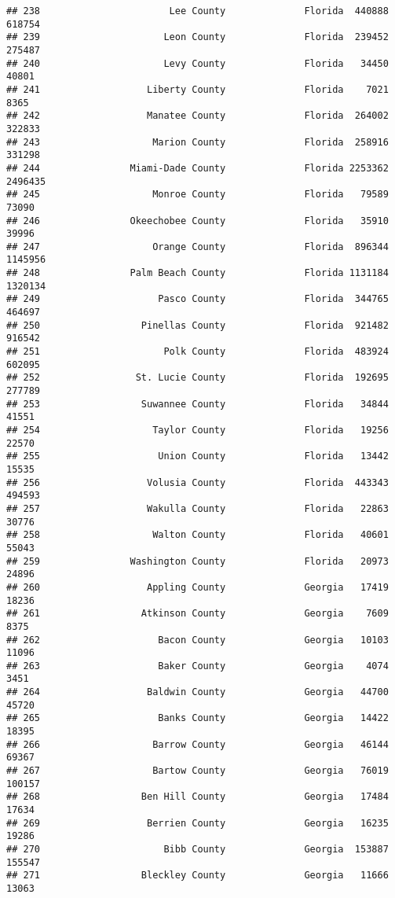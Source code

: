 \documentclass[
]{article}
\begin{document}
\begin{verbatim}
## 238                       Lee County              Florida  440888  618754
## 239                      Leon County              Florida  239452  275487
## 240                      Levy County              Florida   34450   40801
## 241                   Liberty County              Florida    7021    8365
## 242                   Manatee County              Florida  264002  322833
## 243                    Marion County              Florida  258916  331298
## 244                Miami-Dade County              Florida 2253362 2496435
## 245                    Monroe County              Florida   79589   73090
## 246                Okeechobee County              Florida   35910   39996
## 247                    Orange County              Florida  896344 1145956
## 248                Palm Beach County              Florida 1131184 1320134
## 249                     Pasco County              Florida  344765  464697
## 250                  Pinellas County              Florida  921482  916542
## 251                      Polk County              Florida  483924  602095
## 252                 St. Lucie County              Florida  192695  277789
## 253                  Suwannee County              Florida   34844   41551
## 254                    Taylor County              Florida   19256   22570
## 255                     Union County              Florida   13442   15535
## 256                   Volusia County              Florida  443343  494593
## 257                   Wakulla County              Florida   22863   30776
## 258                    Walton County              Florida   40601   55043
## 259                Washington County              Florida   20973   24896
## 260                   Appling County              Georgia   17419   18236
## 261                  Atkinson County              Georgia    7609    8375
## 262                     Bacon County              Georgia   10103   11096
## 263                     Baker County              Georgia    4074    3451
## 264                   Baldwin County              Georgia   44700   45720
## 265                     Banks County              Georgia   14422   18395
## 266                    Barrow County              Georgia   46144   69367
## 267                    Bartow County              Georgia   76019  100157
## 268                  Ben Hill County              Georgia   17484   17634
## 269                   Berrien County              Georgia   16235   19286
## 270                      Bibb County              Georgia  153887  155547
## 271                  Bleckley County              Georgia   11666   13063

\end{verbatim}
\end{document}
